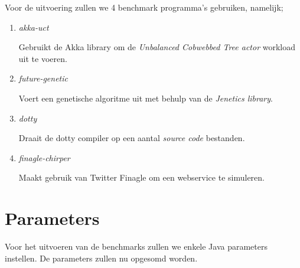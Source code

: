 Voor de uitvoering zullen we 4 benchmark programma's gebruiken, namelijk;


\begin{enumerate}
    \item \textit{akka-uct}
    
    Gebruikt de Akka library om de \textit{Unbalanced Cobwebbed Tree actor } workload uit te voeren.
    
    
    \item \textit{future-genetic}
    
    Voert een genetische algoritme uit met behulp van de \textit{Jenetics library}.
    
    \item \textit{dotty}
    
    Draait de dotty compiler op een aantal \textit{source code} bestanden.
    
    \item \textit{finagle-chirper}
    
    Maakt gebruik van Twitter Finagle om een webservice te simuleren.
    
    
\end{enumerate}


\section{Parameters}
Voor het uitvoeren van de benchmarks zullen we enkele Java parameters instellen.
De parameters zullen nu opgesomd worden.

